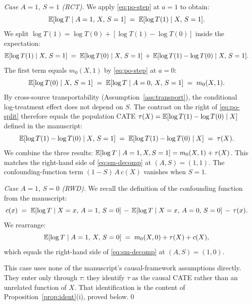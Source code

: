 \emph{Case $A = 1$, $S = 1$ (RCT).}
We apply \eqref{eq:po-step} at $a = 1$ to obtain:
\begin{equation}
\mathbb{E}[\log T \mid A = 1,\, X,\, S = 1] \;=\; \mathbb{E}[\log T(1) \mid X,\, S = 1].
\end{equation}
We split $\log T(1) = \log T(0) + [\log T(1) - \log T(0)]$ inside the expectation:
\begin{equation}
\mathbb{E}[\log T(1) \mid X,\, S = 1] \;=\; \mathbb{E}[\log T(0) \mid X,\, S = 1] \,+\, \mathbb{E}[\log T(1) - \log T(0) \mid X,\, S = 1].
\label{eq:po-split}
\end{equation}
The first term equals $m_0(X, 1)$ by \eqref{eq:po-step} at $a = 0$:
\begin{equation}
\mathbb{E}[\log T(0) \mid X,\, S = 1] \;=\; \mathbb{E}[\log T \mid A = 0,\, X,\, S = 1] \;=\; m_0(X, 1).
\end{equation}
By cross-source transportability (Assumption~\ref{ass:transport}), the conditional log-treatment effect does not depend on $S$.
The contrast on the right of \eqref{eq:po-split} therefore equals the population CATE $\tau(X) = \mathbb{E}[\log T(1) - \log T(0) \mid X]$ defined in the manuscript:
\begin{equation}
\mathbb{E}[\log T(1) - \log T(0) \mid X,\, S = 1] \;=\; \mathbb{E}[\log T(1) - \log T(0) \mid X] \;=\; \tau(X).
\end{equation}
We combine the three results: $\mathbb{E}[\log T \mid A = 1, X, S = 1] = m_0(X, 1) + \tau(X)$.
This matches the right-hand side of \eqref{eq:sm-decomp} at $(A, S) = (1, 1)$.
The confounding-function term $(1 - S)\,A\,c(X)$ vanishes when $S = 1$.

\emph{Case $A = 1$, $S = 0$ (RWD).}
We recall the definition of the confounding function from the manuscript:
\begin{equation}
c(x) \;=\; \mathbb{E}[\log T \mid X = x,\, A = 1,\, S = 0] \,-\, \mathbb{E}[\log T \mid X = x,\, A = 0,\, S = 0] \,-\, \tau(x).
\label{eq:sm-cf}
\end{equation}
We rearrange:
\begin{equation}
\mathbb{E}[\log T \mid A = 1,\, X,\, S = 0] \;=\; m_0(X, 0) + \tau(X) + c(X),
\end{equation}
which equals the right-hand side of \eqref{eq:sm-decomp} at $(A, S) = (1, 0)$.

This case uses none of the manuscript's causal-framework assumptions directly.
They enter only through $\tau$: they identify $\tau$ as the causal CATE rather than an unrelated function of $X$.
That identification is the content of Proposition~\ref{prop:ident}(i), proved below.\qed

